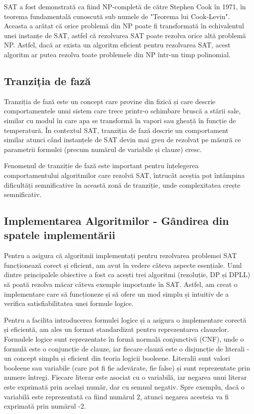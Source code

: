 \documentclass[12pt,a4paper]{article}
\begin{document}
SAT a fost demonstrată ca fiind NP-completă de către Stephen Cook în 1971, în teorema fundamentală cunoscută sub numele de "Teorema lui Cook-Levin". Aceasta a arătat că orice problemă din NP poate fi transformată în echivalentul unei instanțe de SAT, astfel că rezolvarea SAT poate rezolva orice altă problemă NP. Astfel, dacă ar exista un algoritm eficient pentru rezolvarea SAT, acest algoritm ar putea rezolva toate problemele din NP într-un timp polinomial.

\subsection{Tranziția de fază}
Tranziția de fază este un concept care provine din fizică și care descrie comportamentele unui sistem care trece printr-o schimbare bruscă a stării sale, similar cu modul în care apa se transformă în vapori sau gheață în funcție de temperatură. În contextul SAT, tranziția de fază descrie un comportament similar atunci când instanțele de SAT devin mai greu de rezolvat pe măsură ce parametrii formulei (precum numărul de variabile și clauze) cresc.

Fenomenul de tranziție de fază este important pentru înțelegerea comportamentului algoritmilor care rezolvă SAT, întrucât aceștia pot întâmpina dificultăți semnificative în această zonă de tranziție, unde complexitatea crește semnificativ.

\subsection{Implementarea Algoritmilor - Gândirea din spatele implementării}
Pentru a asigura că algoritmii implementați pentru rezolvarea problemei SAT funcționează corect și eficient, am avut în vedere câteva aspecte esențiale. Unul dintre principalele obiective a fost ca acești trei algoritmi (rezoluție, DP și DPLL) să poată rezolva măcar câteva exemple importante în SAT. Astfel, am creat o implementare care să funcționeze și să ofere un mod simplu și intuitiv de a verifica satisfiabilitatea unei formule logice.

Pentru a facilita introducerea formulei logice și a asigura o implementare corectă și eficientă, am ales un format standardizat pentru reprezentarea clauzelor. Formulele logice sunt reprezentate în formă normală conjunctivă (CNF), unde o formulă este o conjuncție de clauze, iar fiecare clauză este o disjuncție de literali - un concept simplu și eficient din teoria logicii booleene. Literalii sunt valori booleene sau variabile (care pot fi fie adevărate, fie false) și sunt reprezentate prin numere întregi. Fiecare literar este asociat cu o variabilă, iar negarea unui literar este exprimată prin același număr, dar cu semnul negativ. Spre exemplu, dacă o variabilă este reprezentată ca fiind numărul 2, atunci negarea acesteia va fi exprimată prin numărul -2.
\end{document}
